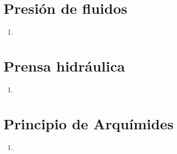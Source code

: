 \documentclass[11pt]{article} %
\begin{document}
\section{Presión de fluidos}
\begin{enumerate}
\item
\end{enumerate}
\section{Prensa hidráulica}
\begin{enumerate}
\item
\end{enumerate}
\section{Principio de Arquímides}
\begin{enumerate}
\item
\end{enumerate}
\end{document}
